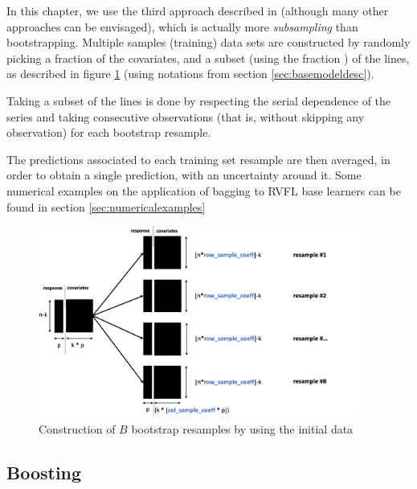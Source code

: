 \medskip

In this chapter, we use the third approach described in \cite{rosen1996ensemble}  (although many other approaches can be envisaged),  which is actually more \textit{subsampling} than bootstrapping. Multiple samples (training) data sets are constructed by randomly picking a fraction  of the covariates, and a subset (using the fraction ) of the lines, as described in figure \ref{bootstrap_resampling_plot} (using notations from section \ref{sec:basemodeldesc}).

Taking a subset of the lines is done by respecting the serial dependence of the series and taking consecutive observations (that is, without skipping any observation) for each bootstrap resample.

The predictions associated to each training set resample are then averaged, in order to obtain a single prediction, with an uncertainty around it. Some numerical examples on the application of bagging to RVFL base learners can be found in section \ref{sec:numericalexamples}

\begin{figure}[!htb]
\centering
\includegraphics[width=10.5cm]{gfx/chapter-rvfl-ensembles/bootstrap_resampling.png}
\caption{Construction of $B$ bootstrap resamples by using the initial data}
\label{bootstrap_resampling_plot}
\end{figure}

\newpage

\subsection{Boosting}
\label{sec:rvflboosting}

